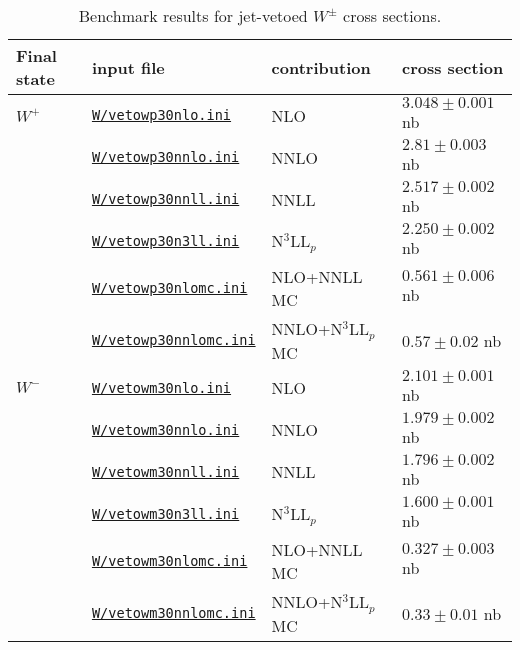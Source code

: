 \renewcommand{\arraystretch}{1.05}
\begin{table}
\begin{tabular}{llll}
\hline
Final state & input file & contribution & cross section \\
\hline
$W^+$                                                                                
& \href{\mcfmprocs/Files1/jetveto/vetowp30nlo.ini}{\texttt{W/vetowp30nlo.ini}}        & NLO                 & $3.048 \pm 0.001$ nb \\
& \href{\mcfmprocs/Files1/jetveto/vetowp30nnlo.ini}{\texttt{W/vetowp30nnlo.ini}}      & NNLO                & $2.81 \pm 0.003$ nb \\
& \href{\mcfmprocs/Files1/jetveto/vetowp30nnll.ini}{\texttt{W/vetowp30nnll.ini}}      & NNLL                & $2.517 \pm 0.002$ nb \\
& \href{\mcfmprocs/Files1/jetveto/vetowp30n3ll.ini}{\texttt{W/vetowp30n3ll.ini}}      & N$^3$LL$_p$         & $2.250 \pm 0.002$ nb \\
& \href{\mcfmprocs/Files1/jetveto/vetowp30nlomc.ini}{\texttt{W/vetowp30nlomc.ini}}    & NLO+NNLL MC         & $0.561 \pm 0.006$ nb \\
& \href{\mcfmprocs/Files1/jetveto/vetowp30nnlomc.ini}{\texttt{W/vetowp30nnlomc.ini}}  & NNLO+N$^3$LL$_p$ MC & $0.57 \pm 0.02$ nb \\[2pt]
\hline                                                                               
$W^-$                                                                                
& \href{\mcfmprocs/Files6/jetveto/vetowm30nlo.ini}{\texttt{W/vetowm30nlo.ini}}        & NLO                 & $2.101 \pm 0.001$ nb \\
& \href{\mcfmprocs/Files6/jetveto/vetowm30nnlo.ini}{\texttt{W/vetowm30nnlo.ini}}      & NNLO                & $1.979 \pm 0.002$ nb \\
& \href{\mcfmprocs/Files6/jetveto/vetowm30nnll.ini}{\texttt{W/vetowm30nnll.ini}}      & NNLL                & $1.796 \pm 0.002$ nb \\
& \href{\mcfmprocs/Files6/jetveto/vetowm30n3ll.ini}{\texttt{W/vetowm30n3ll.ini}}      & N$^3$LL$_p$         & $1.600 \pm 0.001$ nb \\
& \href{\mcfmprocs/Files6/jetveto/vetowm30nlomc.ini}{\texttt{W/vetowm30nlomc.ini}}    & NLO+NNLL MC         & $0.327 \pm 0.003$ nb \\
& \href{\mcfmprocs/Files6/jetveto/vetowm30nnlomc.ini}{\texttt{W/vetowm30nnlomc.ini}}  & NNLO+N$^3$LL$_p$ MC & $0.33 \pm 0.01$ nb \\[2pt]
\hline
\end{tabular}
\caption{Benchmark results for jet-vetoed $W^\pm$ cross sections.}
\label{table:jetveto_W}
\end{table}
\renewcommand{\arraystretch}{1.0}
